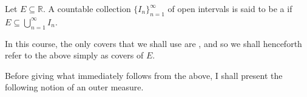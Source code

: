 \documentclass[notoc,notitlepage]{tufte-book}
\begin{document}
\begin{defn}\label{defn:cover_by_open_intervals}
  Let $E \subseteq \mathbb{R}$. A countable collection $\{ I_n
  \}_{n=1}^{\infty}$ of open intervals is said to be a  if $E \subseteq \bigcup_{n=1}^{\infty} I_n$.
\end{defn}

\begin{note}
  In this course, the only covers that we shall use are , and so we shall henceforth refer to the above simply as covers of
  $E$.
\end{note}

Before giving what immediately follows from the above, I shall present the
following notion of an outer measure.
\end{document}
